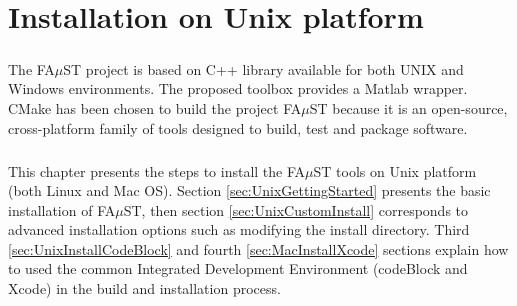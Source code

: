 \chapter{Installation on Unix platform}\label{sec:InstallUnix}

\paragraph{}The FA$\mu$ST project is based on C++ library available for both UNIX and Windows environments. The proposed toolbox provides a Matlab wrapper. CMake has been chosen to build the project FA$\mu$ST because it is an open-source, cross-platform family of tools designed to build, test and package software.

\paragraph{}This chapter presents the steps to install the FA$\mu$ST tools on Unix platform (both Linux and Mac OS). Section \ref{sec:UnixGettingStarted} presents the basic installation of FA$\mu$ST, then section \ref{sec:UnixCustomInstall} corresponds to advanced installation options such as modifying the install directory. Third \ref{sec:UnixInstallCodeBlock} and fourth \ref{sec:MacInstallXcode} sections explain how to used the common Integrated Development Environment (codeBlock and Xcode) in the build and installation process. 


